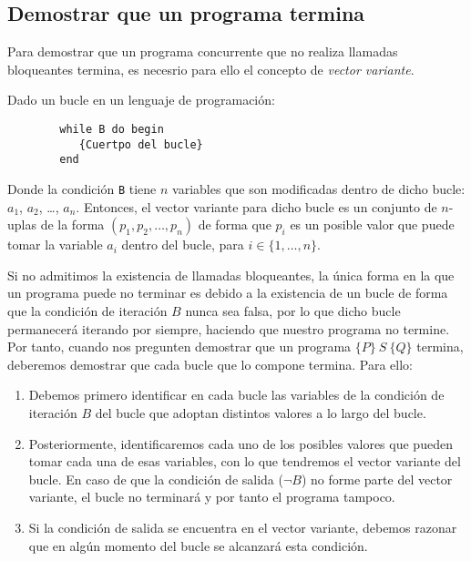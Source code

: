 \subsection{Demostrar que un programa termina}
Para demostrar que un programa concurrente que no realiza llamadas bloqueantes termina, es necesrio para ello el concepto de \textit{vector variante}.

\begin{definicion}
    Dado un bucle en un lenguaje de programación:
    \begin{verbatim}
        while B do begin
           {Cuertpo del bucle}
        end
    \end{verbatim}
    Donde la condición \verb|B| tiene $n$ variables que son modificadas dentro de dicho bucle: $a_1$, $a_2$, \ldots, $a_n$. Entonces, el vector variante para dicho bucle es un conjunto de $n$-uplas de la forma $(p_1, p_2, \ldots, p_n)$ de forma que $p_i$ es un posible valor que puede tomar la variable $a_i$ dentro del bucle, para $i \in \{1, \ldots, n\}$.
\end{definicion}

Si no admitimos la existencia de llamadas bloqueantes, la única forma en la que un programa puede no terminar es debido a la existencia de un bucle de forma que la condición de iteración $B$ nunca sea falsa, por lo que dicho bucle permanecerá iterando por siempre, haciendo que nuestro programa no termine.\\

Por tanto, cuando nos pregunten demostrar que un programa $\{P\}\ S\ \{Q\}$ termina, deberemos demostrar que cada bucle que lo compone termina. Para ello:
\begin{enumerate}
    \item Debemos primero identificar en cada bucle las variables de la condición de iteración $B$ del bucle que adoptan distintos valores a lo largo del bucle.
    \item Posteriormente, identificaremos cada uno de los posibles valores que pueden tomar cada una de esas variables, con lo que tendremos el vector variante del bucle.
        En caso de que la condición de salida ($\lnot B$) no forme parte del vector variante, el bucle no terminará y por tanto el programa tampoco.
    \item Si la condición de salida se encuentra en el vector variante, debemos razonar que en algún momento del bucle se alcanzará esta condición.
\end{enumerate}

